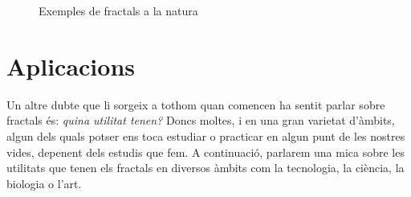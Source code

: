 \documentclass[12pt]{report}
\begin{document}
    
    \begin{figure} [H]
\end{figure}
  \begin{figure} [H]
    \caption{Exemples de fractals a la natura}
\end{figure}
    
\newpage
\section{Aplicacions}
Un altre dubte que li sorgeix a tothom quan comencen ha sentit parlar sobre fractals és: \textit{quina utilitat tenen?} Doncs moltes, i en una gran varietat d'àmbits, algun dels quals potser ens toca estudiar o practicar en algun punt de les nostres vides, depenent dels estudis que fem.
\newline
A continuació, parlarem una mica sobre les utilitats que tenen els fractals en diversos àmbits com la tecnologia, la ciència, la biologia o l'art.
\end{document}
